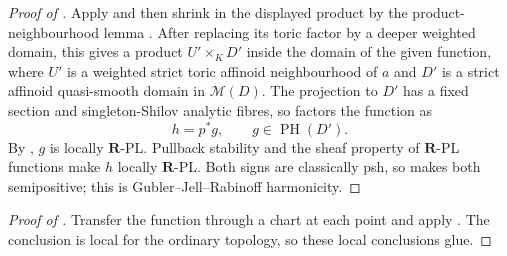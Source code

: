 \begin{proof}[Proof of
]
Apply
 and then shrink in
the displayed product by the product-neighbourhood lemma
.  After replacing its toric factor by a
deeper weighted domain, this gives a product
\(U'\times_KD'\) inside the domain of the given function, where \(U'\) is
a weighted strict toric affinoid neighbourhood of \(a\) and \(D'\) is a
strict affinoid quasi-smooth domain in \(\mathcal M(D)\).  The projection
to \(D'\) has a fixed section and singleton-Shilov analytic fibres, so
 factors the function as
\[
                         h=p^*g,
\qquad g\in\operatorname{PH}(D').
\]
By , \(g\) is locally
\(\mathbf R\)-PL.  Pullback stability and the sheaf property of
\(\mathbf R\)-PL functions make \(h\) locally \(\mathbf R\)-PL.  Both
signs are classically psh, so \cite[Theorem~4.3]{GR25Classical} makes both
semipositive; this is Gubler--Jell--Rabinoff harmonicity.
\end{proof}

\begin{proof}[Proof of
]
Transfer the function through a chart at each point and apply
.  The conclusion is
local for the ordinary topology, so these local conclusions glue.
\end{proof}

